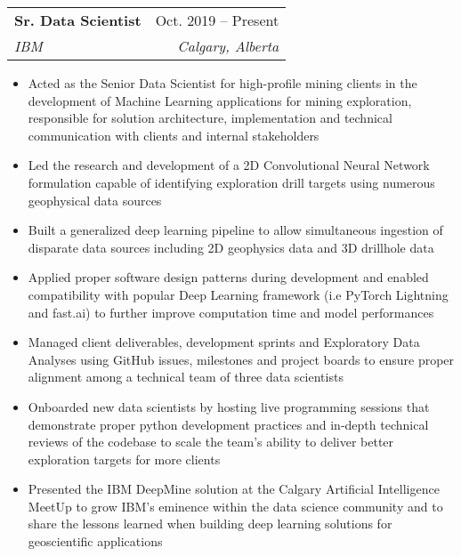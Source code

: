 \documentclass[letterpaper,11pt]{article}
\makeatletter
\newcommand{\resumeItem}[1]{
  \item\small{
    {#1 \vspace{-2pt}}
  }
}
\newcommand{\resumeSubheading}[4]{
  \vspace{-2pt}\item
    \begin{tabular*}{0.97\textwidth}[t]{l@{\extracolsep{\fill}}r}
      \textbf{#1} & #2 \\
      \textit{\small#3} & \textit{\small #4} \\
    \end{tabular*}\vspace{-7pt}
}
\newcommand{\resumeItemListStart}{\begin{itemize}}
\newcommand{\resumeItemListEnd}{\end{itemize}\vspace{-5pt}}
\makeatother
\begin{document}
    \resumeSubheading
      {Sr. Data Scientist}{Oct. 2019 -- Present}
      {IBM}{Calgary, Alberta}
      \resumeItemListStart
        \resumeItem{Acted as the Senior Data Scientist for high-profile mining clients in the development of Machine Learning 
        applications for mining exploration, responsible for solution architecture, implementation and technical communication 
        with clients and internal stakeholders}
        \resumeItem{Led the research and development of a 2D Convolutional Neural Network formulation capable of identifying 
        exploration drill targets using numerous geophysical data sources}
        \resumeItem{Built a generalized deep learning pipeline to allow simultaneous ingestion of disparate data 
        sources including 2D geophysics data and 3D drillhole data}
        \resumeItem{Applied proper software design patterns during development and enabled compatibility with 
        popular Deep Learning framework (i.e PyTorch Lightning and fast.ai) to further improve computation time and 
        model performances}
        \resumeItem{Managed client deliverables, development sprints and Exploratory Data Analyses using
        GitHub issues, milestones and project boards to ensure proper alignment among a technical team of 
        three data scientists}
        \resumeItem{Onboarded new data scientists by hosting live programming sessions that demonstrate proper 
        python development practices and in-depth technical reviews of the codebase to scale the team's ability to 
        deliver better exploration targets for more clients}
        \resumeItem{Presented the IBM DeepMine solution at the Calgary Artificial Intelligence MeetUp to grow 
        IBM’s eminence within the data science community and to share the lessons learned when building 
        deep learning solutions for geoscientific applications}
      \resumeItemListEnd
\end{document}
